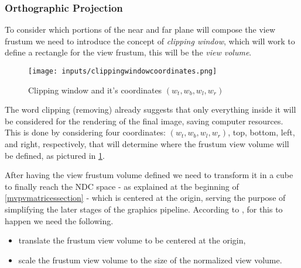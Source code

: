 \documentclass[cic,tc,english]{iiufrgs}
\begin{document}
\subsubsection{Orthographic Projection}
\label{ortographicprojection}

To consider which portions of the near and far plane will compose the view frustum we need to introduce the concept of \textit{clipping window}, which will work to define a rectangle for the view frustum, this will be the \textit{view volume}.

\begin{figure}[h!]
    \caption{Clipping window and it's coordinates $(w_t, w_b, w_l, w_r)$}
    \begin{center}
        \texttt{[image: inputs/clippingwindowcoordinates.png]}
    \end{center}
    \label{clippingwindowcoordinates}
\end{figure}

The word clipping (removing) already suggests that only everything inside it will be considered for the rendering of the final image, saving computer resources. This is done by considering four coordinates: $(w_t, w_b, w_l, w_r)$, top, bottom, left, and right, respectively, that will determine where the frustum view volume will be defined, as pictured in \cref{clippingwindowcoordinates}.

After having the view frustum volume defined we need to transform it in a cube to finally reach the NDC space - as explained at the beginning of \cref{mvpvmatricessection} - which is centered at the origin, serving the purpose of simplifying the later stages of the graphics pipeline. According to \citet{power2015orthographic}, for this to happen we need the following.

\begin{itemize}
    \item translate the frustum view volume to be centered at the origin,
    \item scale the frustum view volume to the size of the normalized view volume.
\end{itemize}
\end{document}
